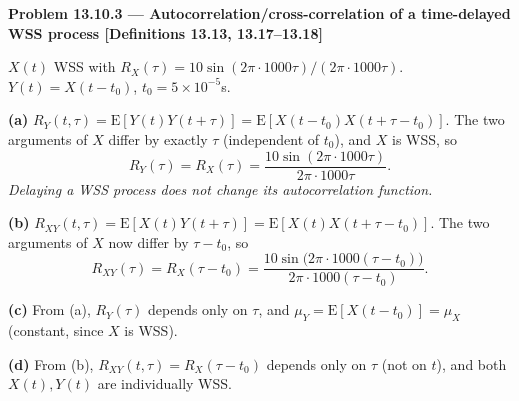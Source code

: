 \documentclass[11pt]{article}
\newcommand{\E}[1]{\mathrm{E}\left[#1\right]}
\newcommand{\topline}[1]{\par\vspace{5pt}\noindent{\color{#1}\rule{\linewidth}{1.1pt}}\par\vspace{3pt}}
\newcommand{\botline}[1]{\par\vspace{2pt}\noindent{\color{#1}\rule{\linewidth}{1.1pt}}\par\vspace{8pt}}
\newenvironment{examprob}[2]{%
  \topline{examcol}\noindent\textbf{\color{examcol}#1 --- #2}\par\smallskip\noindent\ignorespaces
}{\botline{examcol}}
\begin{document}
\begin{examprob}{Problem 13.10.3}{Autocorrelation/cross-correlation of a time-delayed WSS process \hfill [Definitions 13.13, 13.17--13.18]}
$X(t)$ WSS with $R_X(\tau)=10\sin(2\pi\cdot1000\tau)/(2\pi\cdot1000\tau)$. $Y(t)=X(t-t_0)$,
$t_0=5\times10^{-5}$s.

\textbf{(a)} $R_Y(t,\tau)=\E{Y(t)Y(t+\tau)}=\E{X(t-t_0)X(t+\tau-t_0)}$. The two arguments of
$X$ differ by exactly $\tau$ (independent of $t_0$), and $X$ is WSS, so
\[ \boxed{R_Y(\tau) = R_X(\tau) = \frac{10\sin(2\pi\cdot1000\tau)}{2\pi\cdot1000\tau}.} \]
\emph{Delaying a WSS process does not change its autocorrelation function.}

\textbf{(b)} $R_{XY}(t,\tau)=\E{X(t)Y(t+\tau)}=\E{X(t)X(t+\tau-t_0)}$. The two arguments of
$X$ now differ by $\tau-t_0$, so
\[ \boxed{R_{XY}(\tau) = R_X(\tau-t_0) = \frac{10\sin\!\big(2\pi\cdot1000(\tau-t_0)\big)}{2\pi\cdot1000(\tau-t_0)}.} \]

\textbf{(c)} From (a), $R_Y(\tau)$ depends only on $\tau$, and $\mu_Y=\E{X(t-t_0)}=\mu_X$
(constant, since $X$ is WSS). 

\textbf{(d)} From (b), $R_{XY}(t,\tau)=R_X(\tau-t_0)$ depends only on $\tau$ (not on $t$), and
both $X(t),Y(t)$ are individually WSS. 
\end{examprob}
\end{document}
